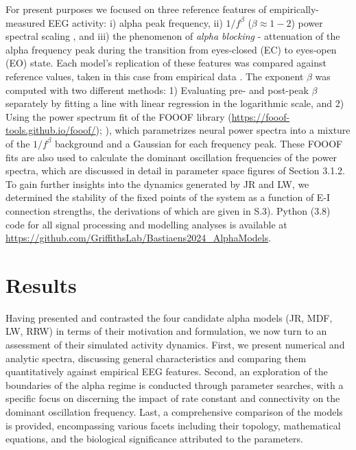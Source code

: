 \documentclass[12pt,twoside]{article}
\begin{document}
For present purposes we focused on three reference features of empirically-measured EEG activity: i) alpha peak frequency, ii) $1/f^{\beta}$ ($\beta \approx 1 - 2$) power spectral scaling  \citep{muthukumaraswamy20181}, and iii) the phenomenon of \textit{alpha blocking} - attenuation of the alpha frequency peak during the transition from eyes-closed (EC) to eyes-open (EO) state. Each model's replication of these features was compared against reference values, taken in this case from empirical data \citet{muthukumaraswamy20181}. The exponent $\beta$ was computed with two different methods: 1) Evaluating pre- and post-peak $\beta$ separately by fitting a line with linear regression in the logarithmic scale, and 2) Using the power spectrum fit of the FOOOF library (\url{https://fooof-tools.github.io/fooof/}); \citealp{donoghue2020parameterizing}), which parametrizes neural power spectra into a mixture of the $1/f^\beta$ background and a Gaussian for each frequency peak. These FOOOF fits are also used to calculate the dominant oscillation frequencies of the power spectra, which are discussed in detail in parameter space figures of Section 3.1.2. To gain further insights into the dynamics generated by JR and LW, we determined the stability of the fixed points of the system as a function of E-I connection strengths, the derivations of which are given in S.3). Python (3.8) code for all signal processing and modelling analyses is available at \url{https://github.com/GriffithsLab/Bastiaens2024\_AlphaModels}. 
\section{Results}
Having presented and contrasted the four candidate alpha models (JR, MDF, LW, RRW) in terms of their motivation and formulation, we now turn to an assessment of their simulated activity dynamics. First, we present numerical and analytic spectra, discussing general characteristics and comparing them quantitatively against empirical EEG features. Second, an exploration of the boundaries of the alpha regime is conducted through parameter searches, with a specific focus on discerning the impact of rate constant and connectivity on the dominant oscillation frequency. Last, a comprehensive comparison of the models is provided, encompassing various facets including their topology, mathematical equations, and the biological significance attributed to the parameters.
\end{document}
